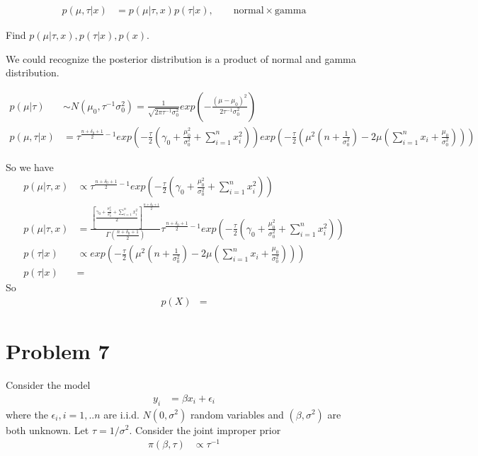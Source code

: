 \documentclass[11pt]{article} %
\begin{document}
\begin{align*}
	p(\mu, \tau|x)&= p(\mu| \tau, x) p(\tau|x), \qquad \text{normal} \times \text{gamma} 
\end{align*}	

Find $p(\mu| \tau, x), p(\tau|x), p(x)$. 

We could recognize the posterior distribution is a product of normal and gamma distribution. 

\begin{align*}
	p(\mu|\tau) & \sim N(\mu_0, \tau^{-1} \sigma_0^2) = \frac{1}{\sqrt{2\pi \tau^{-1} \sigma_0^2} } exp(-\frac{(\mu-\mu_0)^2}{2 \tau^{-1} \sigma_0^2})\\
	p(\mu, \tau|x)&= \tau^{\frac{n + \delta_0 +1}{2} -1} exp(-\frac{\tau}{2} (\gamma_0 + \frac{\mu_0^2}{\sigma_0^2} + \sum_{i=1}^n x_i^2)) exp(-\frac{\tau}{2} (\mu^2(n+\frac{1}{\sigma_0^2}) -2\mu(\sum_{i=1}^n x_i + \frac{\mu_0}{\sigma_0^2}))) 
\end{align*}	

So we have 
\begin{align*}
	p(\mu| \tau,x)& \propto \tau^{\frac{n + \delta_0 +1}{2} -1} exp(-\frac{\tau}{2} (\gamma_0 + \frac{\mu_0^2}{\sigma_0^2} + \sum_{i=1}^n x_i^2)) \\
	p(\mu| \tau,x)& = \frac{[\frac{\gamma_0 + \frac{\mu_0^2}{\sigma_0^2} + \sum_{i=1}^n x_i^2}{2}]^{\frac{n + \delta_0 +1}{2}}}{\Gamma(\frac{n + \delta_0 +1}{2})} \tau^{\frac{n + \delta_0 +1}{2} -1} exp(-\frac{\tau}{2} (\gamma_0 + \frac{\mu_0^2}{\sigma_0^2} + \sum_{i=1}^n x_i^2)) \\
	p(\tau | x)& \propto  exp(-\frac{\tau}{2} (\mu^2(n+\frac{1}{\sigma_0^2}) -2\mu(\sum_{i=1}^n x_i + \frac{\mu_0}{\sigma_0^2}))) \\
	p(\tau | x)&= 
\end{align*}	
So 
\begin{align*}
	p(X) &= 
\end{align*}	

\section{Problem 7}
Consider the model
\begin{align*}
	y_i &= \beta x_i + \epsilon_i
\end{align*}	
where the $\epsilon_i, i=1,..n$ are i.i.d. $N(0, \sigma^2)$ random variables and $(\beta, \sigma^2)$ are both unknown. Let $\tau = 1/\sigma^2$. Consider the joint improper prior
\begin{align*}
	\pi(\beta, \tau) & \propto \tau^{-1}
\end{align*}	
\end{document}
